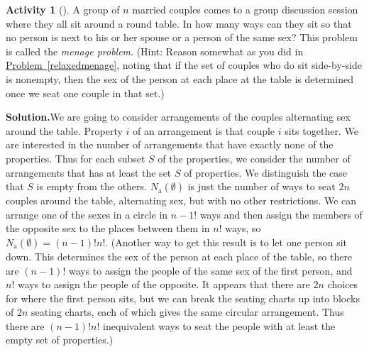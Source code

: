 \documentclass[10pt,]{book}
\theoremstyle{plain}
\theoremstyle{definition}
\newtheorem{activity}[project]{Activity}
\numberwithin{equation}{chapter}
\begin{document}
\begin{activity}[]\label{activity-110}
A group of \(n\) married couples comes to a group discussion session where they all sit around a round table. In how many ways can they sit so that no person is next to his or her spouse or a person of the same sex? This problem is called the \emph{menage problem}. (Hint: Reason somewhat as you did in \hyperref[relaxedmenage]{Problem~\ref{relaxedmenage}}, noting that if the set of couples who do sit side-by-side is nonempty, then the sex of the person at each place at the table is determined once we seat one couple in that set.)%
\par\medskip\noindent%
\textbf{Solution.}\quad We are going to consider arrangements of the couples alternating sex around the table. Property \(i\) of an arrangement is that couple \(i\) sits together. We are interested in the number of arrangements that have exactly none of the properties. Thus for each subset \(S\) of the properties, we consider the number of arrangements that has at least the set \(S\) of properties. We distinguish the case that \(S\) is empty from the others. \(N_{\mbox{a} }(\emptyset)\) is just the number of ways to seat \(2n\) couples around the table, alternating sex, but with no other restrictions. We can arrange one of the sexes in a circle in \(n-1!\) ways and then assign the members of the opposite sex to the places between them in \(n!\) ways, so \(N_{\mbox{a} }(\emptyset) = (n-1)!n!\). (Another way to get this result is to let one person sit down. This determines the sex of the person at each place of the table, so there are \((n-1)!\) ways to assign the people of the same sex of the first person, and \(n!\) ways to assign the people of the opposite. It appears that there are \(2n\) choices for where the first person sits, but we can break the seating charts up into blocks of \(2n\) seating charts, each of which gives the same circular arrangement. Thus there are \((n-1)!n!\) inequivalent ways to seat the people with at least the empty set of properties.)%
\par

\end{activity}
\end{document}
